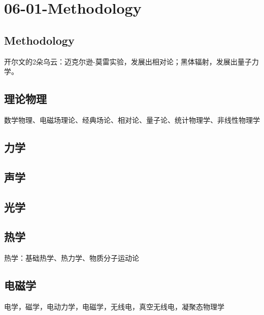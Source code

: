 

\chapter{06-01-Methodology}


\section{Methodology}


开尔文的2朵乌云：迈克尔逊-莫雷实验，发展出相对论；黑体辐射，发展出量子力学。

\section{理论物理}%
数学物理、电磁场理论、经典场论、相对论、量子论、统计物理学、非线性物理学


\section{力学} %



\section{声学} %



\section{光学} %



\section{热学} %
热学：基础热学、热力学、物质分子运动论

\section{电磁学} %
电学，磁学，电动力学，电磁学，无线电，真空无线电，凝聚态物理学



